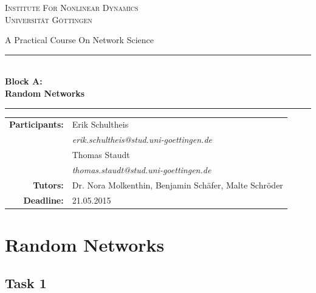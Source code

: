 \documentclass{scrartcl}
\begin{document}
\begin{titlepage}\centering
\textsc{\Large Institute For Nonlinear Dynamics \\[1.5ex] Universität Göttingen}

\vspace*{2cm}
{\huge A Practical Course On Network Science}
\vspace*{2cm}

\rule{\textwidth}{1pt}\\[0.5cm]
{\bfseries \huge Block A: \\[0.5cm] \huge \bfseries Random Networks\\[0.5cm]}
\rule{\textwidth}{1pt}

\vspace*{4cm}

\begin{Large}\begin{tabular}{rl}
        \textbf{Participants:}  & Erik Schultheis                                \\    
                   & \textit{erik.schultheis@stud.uni-goettingen.de}\\[0.5cm]
                   & Thomas Staudt                                  \\
                   & \textit{thomas.staudt@stud.uni-goettingen.de}  \\[1.0cm]

       \textbf{Tutors:}        & Dr. Nora Molkenthin, Benjamin Schäfer, Malte Schröder  \\[1.0cm]
       \textbf{Deadline:}      & 21.05.2015
\end{tabular}\end{Large}

\vspace*{1.5cm}


\end{titlepage}

\tableofcontents
\clearpage

\section{Random Networks}
\subsection{Task 1}
\end{document}
